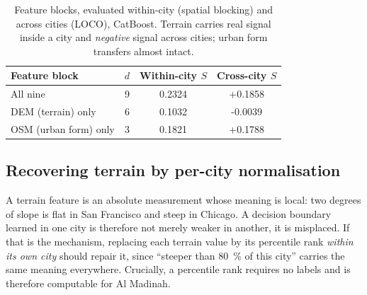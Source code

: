 \documentclass[11pt]{article}
\newcommand{\skl}{\ensuremath{S}}
\begin{document}
\begin{table}[t]
\centering\small
\caption{Feature blocks, evaluated within-city (spatial blocking) and across
cities (LOCO), CatBoost. Terrain carries real signal inside a city and
\emph{negative} signal across cities; urban form transfers almost intact.}
\label{tab:block}
\begin{tabular}{@{}lcS[table-format=1.4]S[table-format=+1.4]@{}}
\toprule
Feature block & $d$ & {Within-city \skl} & {Cross-city \skl} \\
\midrule
All nine                      & 9 & 0.2324 & +0.1858 \\
DEM (terrain) only            & 6 & 0.1032 & -0.0039 \\
OSM (urban form) only         & 3 & 0.1821 & +0.1788 \\
\bottomrule
\end{tabular}
\end{table}

\subsection{Recovering terrain by per-city normalisation}
A terrain feature is an absolute measurement whose meaning is local: two degrees
of slope is flat in San Francisco and steep in Chicago. A decision boundary
learned in one city is therefore not merely weaker in another, it is misplaced.
If that is the mechanism, replacing each terrain value by its percentile rank
\emph{within its own city} should repair it, since ``steeper than
\SI{80}{\percent} of this city'' carries the same meaning everywhere. Crucially,
a percentile rank requires no labels and is therefore computable for
Al Madinah.
\end{document}
